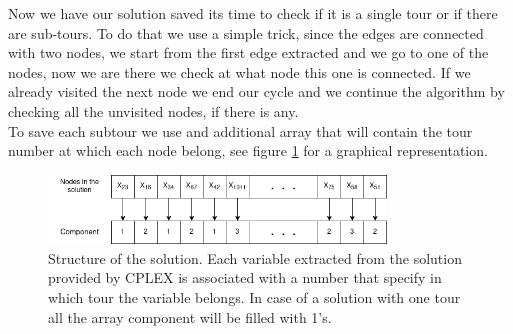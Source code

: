 Now we have our solution saved its time to check if it is a single tour or if there are sub-tours. To do that we use a simple trick, since the edges are connected with two nodes, we start from the first edge extracted and we go to one of the nodes, now we are there we check at what node this one is connected. If we already visited the next node we end our cycle and we continue the algorithm by checking all the unvisited nodes, if there is any.\\
To save each subtour we use and additional array that will contain the tour number at which each node belong, see figure \ref{img:comp} for a graphical representation.

\begin{figure}
	\centering
	\includegraphics[width=0.8\textwidth]{images/components}
	\caption{Structure of the solution. Each variable extracted from the solution provided by CPLEX is associated with a number that specify in which tour the variable belongs. In case of a solution with one tour all the array component will be filled with 1's.}
	\label{img:comp}
\end{figure} 